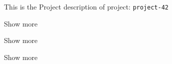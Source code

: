 This is the Project description of project: \texttt{project-42}


Show more


Show more

\pagebreak


Show more


